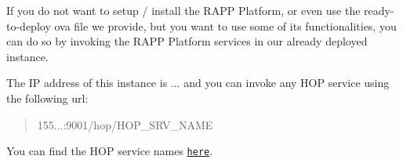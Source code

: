 If you do not want to setup / install the R\-A\-P\-P Platform, or even use the ready-\/to-\/deploy ova file we provide, but you want to use some of its functionalities, you can do so by invoking the R\-A\-P\-P Platform services in our already deployed instance.

The I\-P address of this instance is {...} and you can invoke any H\-O\-P service using the following url\-:

\begin{quotation}
155...\-:9001/hop/\-H\-O\-P\-\_\-\-S\-R\-V\-\_\-\-N\-A\-M\-E

\end{quotation}


You can find the H\-O\-P service names \href{https://github.com/rapp-project/rapp-platform/wiki/RAPP-HOP-Web-services}{\tt here}. 